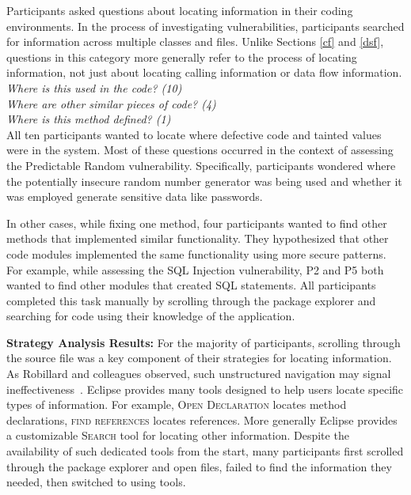 \documentclass[10pt,journal,compsoc]{IEEEtran}
\begin{document}
Participants asked questions about locating information in their coding environments.
In the process of investigating vulnerabilities, participants searched for information across multiple classes and files.
Unlike Sections \ref{cf} and \ref{dsf}, questions in this category more generally refer to the process of locating information, not just about locating calling information or data flow information.
\\

\noindent\emph{Where is this used in the code? (10)} \\
\emph{Where are other similar pieces of code? (4)} \\
\emph{Where is this method defined? (1)} 
\\

All ten participants wanted to locate where defective code and tainted values were in the system. 
Most of these questions occurred in the context of assessing the Predictable Random vulnerability.
Specifically, participants wondered where the potentially insecure random number generator was being used and whether it was employed generate sensitive data like passwords.

In other cases, while fixing one method, four participants wanted to find other methods that implemented similar functionality.
They hypothesized that other code modules implemented the same functionality using more secure patterns. 
For example, while assessing the SQL Injection vulnerability, P2 and P5 both wanted to find other modules that created SQL statements.
All participants completed this task manually by scrolling through the package explorer and searching for code using their knowledge of the application.



\textbf{Strategy Analysis Results:}
For the majority of participants, scrolling through the source file was a key component of their strategies for locating information.
As Robillard and colleagues observed, such unstructured navigation may signal ineffectiveness~\cite{robillard2004effective}.
Eclipse provides many tools designed to help users locate specific types of information.
For example, \textsc{Open Declaration} locates method declarations, \textsc{find references} locates references.
More generally Eclipse provides a customizable \textsc{Search} tool for locating other information.
Despite the availability of such dedicated tools from the start, many participants first scrolled through the package explorer and open files, failed to find the information they needed, then switched to using tools. 
\end{document}
